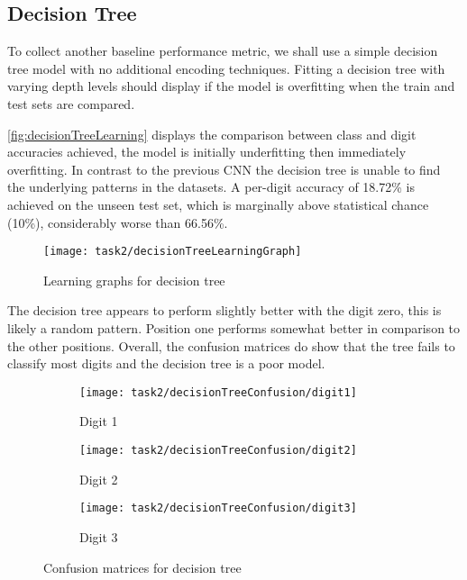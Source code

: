 \pagebreak
\subsection{Decision Tree}
To collect another baseline performance metric, we shall use a simple decision tree model with no additional encoding techniques. Fitting a decision tree with varying depth levels should display if the model is overfitting when the train and test sets are compared.

\autoref{fig:decisionTreeLearning} displays the comparison between class and digit accuracies achieved, the model is initially underfitting then immediately overfitting. In contrast to the previous CNN the decision tree is unable to find the underlying patterns in the datasets. A per-digit accuracy of 18.72\% is achieved on the unseen test set, which is marginally above statistical chance (10\%), considerably worse than 66.56\%.

\begin{figure}[!htbp]
    \centering
    \texttt{[image: task2/decisionTreeLearningGraph]}
    \caption[Learning graphs for decision tree]
    {Learning graphs for decision tree}
    \label{fig:decisionTreeLearning}
\end{figure}


The decision tree appears to perform slightly better with the digit zero, this is likely a random pattern. Position one performs somewhat better in comparison to the other positions. Overall, the confusion matrices do show that the tree fails to classify most digits and the decision tree is a poor model.

\begin{figure}[!htbp]
    \centering
    \begin{subfigure}{0.3\textwidth}
        \texttt{[image: task2/decisionTreeConfusion/digit1]}
        \caption{Digit 1}
        \label{fig:decisionTreeConfusionMatrix1}
    \end{subfigure}
    \begin{subfigure}{0.3\textwidth}
        \texttt{[image: task2/decisionTreeConfusion/digit2]}
        \caption{Digit 2}
        \label{fig:decisionTreeConfusionMatrix2}
    \end{subfigure}
    \begin{subfigure}{0.3\textwidth}
        \texttt{[image: task2/decisionTreeConfusion/digit3]}
        \caption{Digit 3}
        \label{fig:decisionTreeConfusionMatrix3}
    \end{subfigure}
    \caption{Confusion matrices for decision tree}
    \label{fig:decisionTreeConfusionMatrix}
\end{figure}

